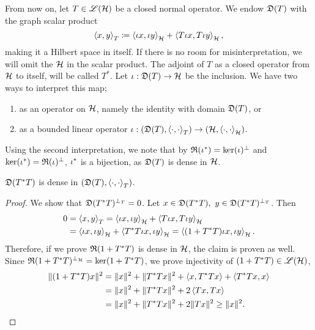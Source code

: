 From now on, let $T \in \mathscr{L}(\mathcal{H})$ be a closed normal operator. 
We endow $\mathfrak{D}(T)$ with the graph scalar product
\[
 \left\langle x,y \right\rangle_T \coloneqq  \left\langle \iota x, \iota y \right\rangle_{\mathcal{H}} +
 \left\langle  T \iota x, T \iota y \right\rangle_{\mathcal{H}},
\]
making it a Hilbert space in itself. 
If there is no room for misinterpretation,
we will omit the $\mathcal{H}$ in the scalar product. The adjoint of $T$ as a closed 
operator from $\mathcal{H}$ to itself, will be called $T^*$. 
Let $\iota : \mathfrak{D}(T) \to \mathcal{H}$ be the inclusion.
We have two ways to interpret this map;
\begin{enumerate}
 \item as an operator on $\mathcal{H}$, namely the identity with domain $\mathfrak{D}(T)$, or
 \item as a bounded linear operator $\iota : ( \mathfrak{D}(T) , \left\langle \cdot, \cdot \right\rangle_T)
 \to ( \mathcal{H} , \left\langle \cdot, \cdot \right\rangle_{\mathcal{H}})$.
\end{enumerate}
Using the second interpretation, we note that by $\mathfrak{R}(\iota^{*}) = \ker(\iota)^\perp$
and $\ker(\iota^{*}) = \mathfrak{R}(\iota)^\perp$, $\iota^{*}$ is a bijection,
as $\mathfrak{D}(T)$ is dense in $\mathcal{H}$. 
\begin{lem}
 $\mathfrak{D}(T^{*} T)$ is dense in $( \mathfrak{D}(T) , \left\langle \cdot, \cdot \right\rangle_T)$.
\end{lem}
\begin{proof}
 We show that $\mathfrak{D}(T ^{*} T)^{\perp_T} = 0$. Let $x \in \mathfrak{D}(T ^{*} T), 
 ~y \in \mathfrak{D}(T ^{*} T)^{\perp_T}$. Then
 \begin{align*}
  0 &=\left\langle x, y \right\rangle_T = \left\langle \iota x, \iota y \right\rangle_{\mathcal{H}} + \left\langle T\iota x, T\iota y \right\rangle
  _{\mathcal{H}} \\
  &=\left\langle \iota x, \iota y \right\rangle_{\mathcal{H}} + \left\langle T^{*} T\iota x, \iota y \right\rangle_{\mathcal{H}}
  = \left\langle (1 + T ^{*} T) \iota x, \iota y \right\rangle_{\mathcal{H}}.
 \end{align*}
Therefore, if we prove $\mathfrak{R}(1 + T^{*} T)$ is dense in $\mathcal{H}$, the claim is
proven as well. Since $\mathfrak{R}(1 + T^{*} T)^{\perp_{\mathcal{H}}} = \ker(1 + T^{*} T)$, we prove
injectivity of $(1 + T^{*} T) \in \mathscr{L}(\mathcal{H})$,
\begin{align*}
 \| (1 + T^{*} T)x \| ^2  
 &= \|x \| ^2 + \| T ^{*} T x\| ^2 + \left\langle x, T^{*} T x \right\rangle
 + \left\langle T ^{*} T x, x \right\rangle\\
 &=\|x \| ^2 + \| T ^{*} T x\| ^2 + 2\left\langle Tx,  T x \right\rangle \\
 &= \|x \| ^2 + \| T ^{*} T x\| ^2 + 2\|T x\|^2 \geq \|x\|^2.
\end{align*}

\end{proof}


